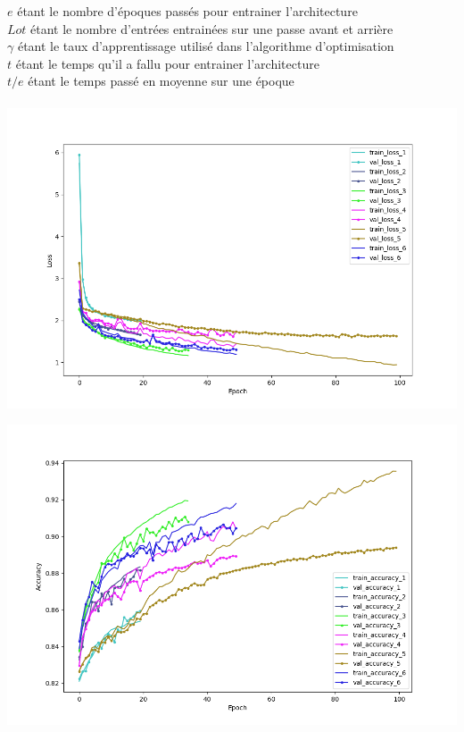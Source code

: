 \begin{multicols}{2}
{$e$ étant le nombre d'époques passés pour entrainer l'architecture \\

$Lot$ étant le nombre d'entrées entrainées sur une passe avant et arrière \\

$\gamma$ étant le taux d'apprentissage utilisé dans l'algorithme d'optimisation \\

$t$ étant le temps qu'il a fallu pour entrainer l'architecture \\

$t/e$ étant le temps passé en moyenne sur une époque \\
} \\

\includegraphics[width=\columnwidth]{images/cifar_10_losses.png}
\hfill\break

\includegraphics[width=\columnwidth]{images/cifar_10_accuracies.png}
\hfill\break


\end{multicols}
